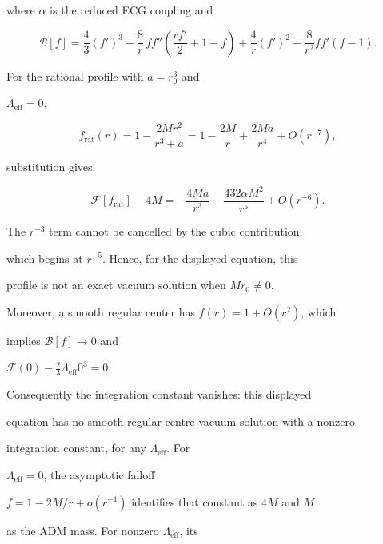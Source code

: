 where \(\alpha\) is the reduced ECG coupling and

\[

\mathcal B[f]

=

\frac43(f')^3

-\frac8r\,ff''

 \left(\frac{rf'}2+1-f\right)

+\frac4r(f')^2

-\frac8{r^2}ff'(f-1).

\]

For the rational profile with \(a=r_0^3\) and

\(\Lambda_{\mathrm{eff}}=0\),

\[

f_{\mathrm{rat}}(r)

=

1-\frac{2Mr^2}{r^3+a}

=

1-\frac{2M}{r}+\frac{2Ma}{r^4}+O(r^{-7}),

\]

substitution gives

\[

\mathcal F[f_{\mathrm{rat}}]-4M

=-\frac{4Ma}{r^3}-\frac{432\alpha M^2}{r^5}+O(r^{-6}).

\]

The \(r^{-3}\) term cannot be cancelled by the cubic contribution,

which begins at \(r^{-5}\). Hence, for the displayed equation, this

profile is not an exact vacuum solution when \(Mr_0\ne0\).



Moreover, a smooth regular center has \(f(r)=1+O(r^2)\), which

implies \(\mathcal B[f]\to0\) and

\(\mathcal F(0)-\tfrac23\Lambda_{\mathrm{eff}}0^3=0\).

Consequently the integration constant vanishes: this displayed

equation has no smooth regular-centre vacuum solution with a nonzero

integration constant, for any \(\Lambda_{\mathrm{eff}}\). For

\(\Lambda_{\mathrm{eff}}=0\), the asymptotic falloff

\(f=1-2M/r+o(r^{-1})\) identifies that constant as \(4M\) and \(M\)

as the ADM mass. For nonzero \(\Lambda_{\mathrm{eff}}\), its

